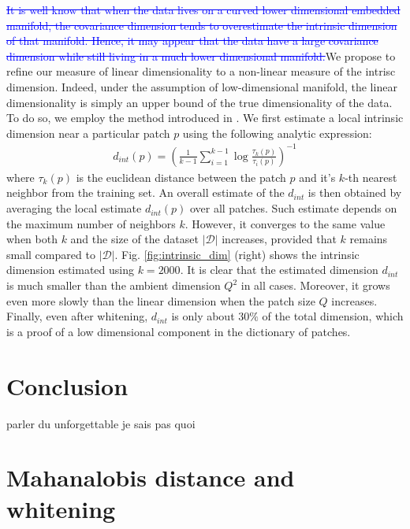 \documentclass{article}
\newcommand{\Edouard}[1]{\textcolor{blue}{#1}}
\begin{document}
{\Edouard{\sout{It is well know that when the data lives on a curved lower dimensional embedded manifold, the covariance dimension tends to overestimate the intrinsic dimension of that manifold. Hence, it may appear that the data have a large covariance dimension while still living in a much lower dimensional manifold.}}We propose to refine our measure of linear dimensionality to a non-linear measure of the intrisc dimension. Indeed, under the assumption of low-dimensional manifold, the linear dimensionality is simply an upper bound of the true dimensionality of the data. To do so, we employ the method introduced in \citep{}. We first estimate a local intrinsic dimension near a particular patch $p$ using the following analytic expression:
\begin{align}
	d_{int}(p) = \left( \frac{1}{k-1} \sum_{i=1}^{k-1}\log \frac{\tau_k(p)}{\tau_i(p)} \right)^{-1} 
\end{align}
where $\tau_k(p)$ is the euclidean distance between the patch $p$ and it's $k$-th nearest neighbor from the training set. 
An overall estimate of the $d_{int}$ is then obtained by averaging the local estimate $d_{int}(p)$ over all patches. Such estimate depends on the maximum number of neighbors $k$. However, it converges to the same value when both $k$ and the size of the dataset $| \mathcal{D}|$ increases, provided that $k$ remains small compared to  $ |\mathcal{D}|$. Fig. \ref{fig:intrinsic_dim} (right) shows the intrinsic dimension estimated using $k=2000$. It is clear that the estimated dimension $d_{int}$ is much smaller than the ambient dimension $Q
^2$ in all cases. Moreover, it grows even more slowly than the linear dimension when the patch size $Q$ increases. Finally, even after whitening, $d_{int}$ is only about $30\%$ of the total dimension, which is a proof of a low dimensional component in the dictionary of patches.   
\section{Conclusion}
parler du unforgettable je sais pas quoi




{}

\newpage

\appendix

\section{Mahanalobis distance and whitening}

}
\end{document}
